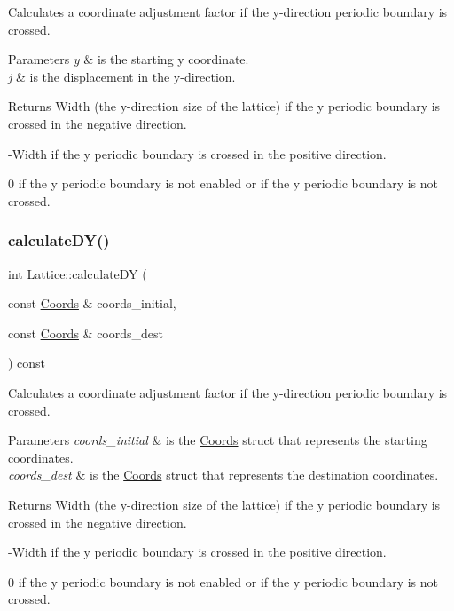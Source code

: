 Calculates a coordinate adjustment factor if the y-\/direction periodic boundary is crossed. 


\begin{DoxyParams}{Parameters}
{\em y} & is the starting y coordinate. \\
\hline
{\em j} & is the displacement in the y-\/direction. \\
\hline
\end{DoxyParams}
\begin{DoxyReturn}{Returns}
Width (the y-\/direction size of the lattice) if the y periodic boundary is crossed in the negative direction. 

-\/\+Width if the y periodic boundary is crossed in the positive direction. 

0 if the y periodic boundary is not enabled or if the y periodic boundary is not crossed. 
\end{DoxyReturn}
\mbox{\label{class_lattice_a4e8b3577701ec0cefce595f6956b22e3}} 
\subsubsection{\texorpdfstring{calculate\+D\+Y()}{calculateDY()}\hspace{0.1cm}{\footnotesize\ttfamily [2/2]}}
{\footnotesize\ttfamily int Lattice\+::calculate\+DY (\begin{DoxyParamCaption}\item[{const \hyperlink{struct_coords}{Coords} \&}]{coords\+\_\+initial,  }\item[{const \hyperlink{struct_coords}{Coords} \&}]{coords\+\_\+dest }\end{DoxyParamCaption}) const}



Calculates a coordinate adjustment factor if the y-\/direction periodic boundary is crossed. 


\begin{DoxyParams}{Parameters}
{\em coords\+\_\+initial} & is the \hyperlink{struct_coords}{Coords} struct that represents the starting coordinates. \\
\hline
{\em coords\+\_\+dest} & is the \hyperlink{struct_coords}{Coords} struct that represents the destination coordinates. \\
\hline
\end{DoxyParams}
\begin{DoxyReturn}{Returns}
Width (the y-\/direction size of the lattice) if the y periodic boundary is crossed in the negative direction. 

-\/\+Width if the y periodic boundary is crossed in the positive direction. 

0 if the y periodic boundary is not enabled or if the y periodic boundary is not crossed. 
\end{DoxyReturn}
\mbox{\label{class_lattice_a584ff9c528ebe46a6aea6ed652d107f4}} 
